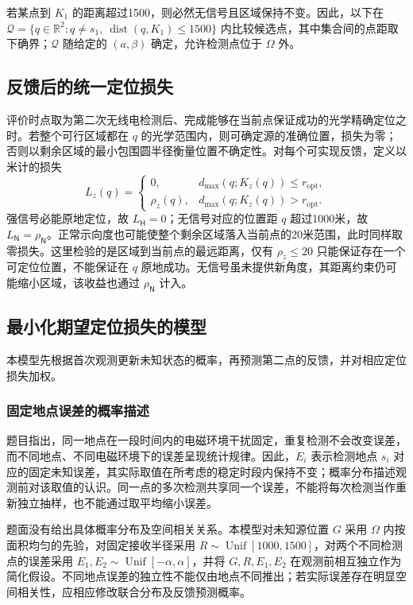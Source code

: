 若某点到 \(K_1\) 的距离超过1500，则必然无信号且区域保持不变。因此，以下在 \(\mathcal Q=\{q\in\mathbb R^2:q\ne s_1,\ \operatorname{dist}(q,K_1)\le1500\}\) 内比较候选点，其中集合间的点距取下确界；\(\mathcal Q\) 随给定的 \((a,\beta)\) 确定，允许检测点位于 \(\Omega\) 外。

\subsection{反馈后的统一定位损失}

评价时点取为第二次无线电检测后、完成能够在当前点保证成功的光学精确定位之时。若整个可行区域都在 \(q\) 的光学范围内，则可确定源的准确位置，损失为零；否则以剩余区域的最小包围圆半径衡量位置不确定性。对每个可实现反馈，定义以米计的损失
\begin{equation}
 L_z(q)=
 \begin{cases}
 0,&d_{\max}(q;K_z(q))\le r_{\mathrm{opt}},\\
 \rho_z(q),&d_{\max}(q;K_z(q))>r_{\mathrm{opt}}.
 \end{cases}
\label{eq:q2-pair-loss}
\end{equation}
强信号必能原地定位，故 \(L_{\mathsf H}=0\)；无信号对应的位置距 \(q\) 超过1000米，故 \(L_{\mathsf N}=\rho_{\mathsf N}\)。正常示向度也可能使整个剩余区域落入当前点的20米范围，此时同样取零损失。这里检验的是区域到当前点的最远距离，仅有 \(\rho_z\le20\) 只能保证存在一个可定位位置，不能保证在 \(q\) 原地成功。无信号虽未提供新角度，其距离约束仍可能缩小区域，该收益也通过 \(\rho_{\mathsf N}\) 计入。

\subsection{最小化期望定位损失的模型}

本模型先根据首次观测更新未知状态的概率，再预测第二点的反馈，并对相应定位损失加权。

\subsubsection{固定地点误差的概率描述}

题目指出，同一地点在一段时间内的电磁环境干扰固定，重复检测不会改变误差，而不同地点、不同电磁环境下的误差呈现统计规律。因此，\(E_i\) 表示检测地点 \(s_i\) 对应的固定未知误差，其实际取值在所考虑的稳定时段内保持不变；概率分布描述观测前对该取值的认识。同一点的多次检测共享同一个误差，不能将每次检测当作重新独立抽样，也不能通过取平均缩小误差。

题面没有给出具体概率分布及空间相关关系。本模型对未知源位置 \(G\) 采用 \(\Omega\) 内按面积均匀的先验，对固定接收半径采用 \(R\sim\operatorname{Unif}[1000,1500]\)，对两个不同检测点的误差采用 \(E_1,E_2\sim\operatorname{Unif}[-\alpha,\alpha]\)，并将 \(G,R,E_1,E_2\) 在观测前相互独立作为简化假设。不同地点误差的独立性不能仅由地点不同推出；若实际误差存在明显空间相关性，应相应修改联合分布及反馈预测概率。


